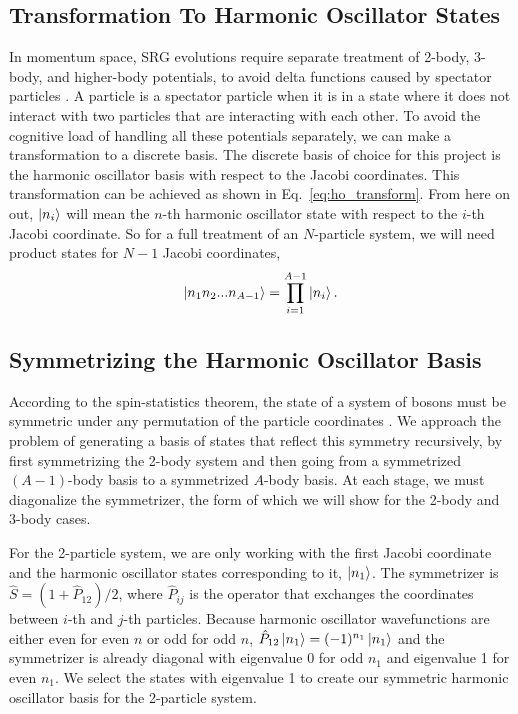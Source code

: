 \subsection{Transformation To Harmonic Oscillator States}

In momentum space, SRG evolutions require separate treatment of 2-body, 3-body, and higher-body potentials, to avoid delta functions caused by spectator particles \cite{glöckle1983quantum}. A particle is a spectator particle when it is in a state where it does not interact with two particles that are interacting with each other. To avoid the cognitive load of handling all these potentials separately, we can make a transformation to a discrete basis. The discrete basis of choice for this project is the harmonic oscillator basis with respect to the Jacobi coordinates. This transformation can be achieved as shown in Eq.~\ref{eq:ho_transform}. From here on out, $\ket{n_i}$ will mean the $n$-th harmonic oscillator state with respect to the $i$-th Jacobi coordinate. So for a full treatment of an $N$-particle system, we will need product states for $N-1$ Jacobi coordinates,
\begin{equation}
\ket{n_1 n_2 ... n_{A-1}} = \prod_{i=1}^{A-1}\ket{n_i}.
\end{equation}

\subsection{Symmetrizing the Harmonic Oscillator Basis}

According to the spin-statistics theorem, the state of a system of bosons must be symmetric under any permutation of the particle coordinates \cite{streater2000pct}. We approach the problem of generating a basis of states that reflect this symmetry recursively, by first symmetrizing the 2-body system and then going from a symmetrized $(A-1)$-body basis to a symmetrized $A$-body basis. At each stage, we must diagonalize the symmetrizer, the form of which we will show for the 2-body and 3-body cases.

For the 2-particle system, we are only working with the first Jacobi coordinate and the harmonic oscillator states corresponding to it, $\ket{n_1}$. The symmetrizer is $\hat{S} = (1 + \hat{P}_{12})/2$, where $\hat{P}_{ij}$ is the operator that exchanges the coordinates between $i$-th and $j$-th particles. Because harmonic oscillator wavefunctions are either even for even $n$ or odd for odd $n$, $\hat{P}_{12} \ket{n_1} = (-1)^{n_1} \ket{n_1}$ and the symmetrizer is already diagonal with eigenvalue 0 for odd $n_1$ and eigenvalue 1 for even $n_1$. We select the states with eigenvalue 1 to create our symmetric harmonic oscillator basis for the 2-particle system.

